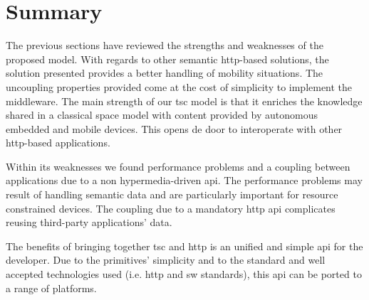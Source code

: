 \section{Summary}

The previous sections have reviewed the strengths and weaknesses of the proposed model.
With regards to other semantic \ac{http}-based solutions, the solution presented provides a better handling of mobility situations. %
The uncoupling properties provided come at the cost of simplicity to implement the middleware.
The main strength of our \ac{tsc} model is that it enriches the knowledge shared in a classical space model with content provided by autonomous embedded and mobile devices.
This opens de door to interoperate with other \ac{http}-based applications.


Within its weaknesses we found performance problems and a coupling between applications due to a non hypermedia-driven \ac{api}.
The performance problems may result of handling semantic data and are particularly important for resource constrained devices.
The coupling due to a mandatory \ac{http} \ac{api} complicates reusing third-party applications' data.


The benefits of bringing together \ac{tsc} and \ac{http} is an unified and simple \ac{api} for the developer. %
Due to the primitives' simplicity and to the standard and well accepted technologies used (i.e. \ac{http} and \ac{sw} standards), this \ac{api} can be ported to a range of platforms.
